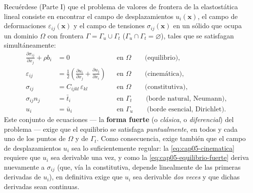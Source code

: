 Recuérdese (Parte I) que el problema de valores de frontera de la elastostática lineal consiste en encontrar el campo de desplazamientos $u_i(\bm x)$, el campo de deformaciones $\varepsilon_{ij}(\bm x)$ y el campo de tensiones $\sigma_{ij}(\bm x)$ en un sólido que ocupa un dominio $\Omega$ con frontera $\Gamma=\Gamma_u\cup\Gamma_t$ ($\Gamma_u\cap\Gamma_t=\varnothing$), tales que se satisfagan simultáneamente:
\begin{align}
\frac{\partial \sigma_{ij}}{\partial x_j} + \rho b_i &= 0 && \text{en } \Omega \qquad \text{(equilibrio)}, \label{eq:cap05-equilibrio-fuerte}\\
\varepsilon_{ij} &= \frac12\left(\frac{\partial u_i}{\partial x_j}+\frac{\partial u_j}{\partial x_i}\right) && \text{en } \Omega \qquad \text{(cinemática)}, \label{eq:cap05-cinematica}\\
\sigma_{ij} &= C_{ijkl}\,\varepsilon_{kl} && \text{en } \Omega \qquad \text{(constitutiva)}, \label{eq:cap05-constitutiva}\\
\sigma_{ij} n_j &= \bar t_i && \text{en } \Gamma_t \qquad \text{(borde natural, Neumann)}, \label{eq:cap05-bc-neumann}\\
u_i &= \bar u_i && \text{en } \Gamma_u \qquad \text{(borde esencial, Dirichlet)}. \label{eq:cap05-bc-dirichlet}
\end{align}
Este conjunto de ecuaciones --- la \textbf{forma fuerte} (o \emph{clásica}, o \emph{diferencial}) del problema --- exige que el equilibrio se satisfaga \emph{puntualmente}, en todos y cada uno de los puntos de $\Omega$ y de $\Gamma_t$. Como consecuencia, exige también que el campo de desplazamientos $u_i$ sea lo suficientemente regular: la \cref{eq:cap05-cinematica} requiere que $u_i$ sea derivable una vez, y como la \cref{eq:cap05-equilibrio-fuerte} deriva nuevamente a $\sigma_{ij}$ (que, vía la constitutiva, depende linealmente de las primeras derivadas de $u_i$), en definitiva exige que $u_i$ sea derivable \emph{dos veces} y que dichas derivadas sean continuas.

